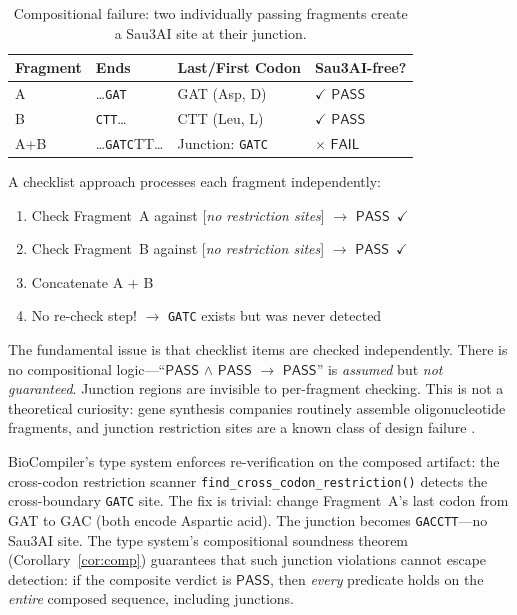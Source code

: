 \documentclass[acmsmall,review,anonymous]{acmart}
\newcommand{\PASS}{\ensuremath{\mathsf{PASS}}\xspace}
\newcommand{\FAIL}{\ensuremath{\mathsf{FAIL}}\xspace}
\begin{document}
\begin{table}[t]
\centering
\caption{Compositional failure: two individually passing fragments
         create a Sau3AI site at their junction.}
\label{tab:junction}
\begin{tabular}{llll}
\toprule
\textbf{Fragment} & \textbf{Ends} & \textbf{Last/First Codon} &
  \textbf{Sau3AI-free?} \\
\midrule
A & \dots\texttt{GAT} & GAT (Asp, D) & $\checkmark$ \PASS \\
B & \texttt{CTT}\dots & CTT (Leu, L) & $\checkmark$ \PASS \\
A+B & \dots\texttt{GATC}TT\dots & Junction: \texttt{GATC} &
  $\times$ \FAIL \\
\bottomrule
\end{tabular}
\end{table}

A checklist approach processes each fragment independently:
\begin{enumerate}[leftmargin=*,itemsep=0pt,topsep=1pt]
\item Check Fragment~A against [\emph{no restriction sites}]
      $\to$ \PASS~$\checkmark$
\item Check Fragment~B against [\emph{no restriction sites}]
      $\to$ \PASS~$\checkmark$
\item Concatenate A $+$ B
\item No re-check step! $\to$ \texttt{GATC} exists but was never
      detected
\end{enumerate}

The fundamental issue is that checklist items are checked
independently.
There is no compositional logic---``\PASS{} $\wedge$ \PASS{}
$\to$ \PASS'' is \emph{assumed} but \emph{not guaranteed}.
Junction regions are invisible to per-fragment checking.
This is not a theoretical curiosity: gene synthesis companies
routinely assemble oligonucleotide fragments, and junction
restriction sites are a known class of design failure
\cite{piret2020dnachisel}.

BioCompiler's type system enforces re-verification on the composed
artifact: the cross-codon restriction scanner
\texttt{find\_cross\_codon\_restriction()} detects the cross-boundary
\texttt{GATC} site.
The fix is trivial: change Fragment~A's last codon from GAT to GAC
(both encode Aspartic acid).
The junction becomes \texttt{GACCTT}---no Sau3AI site.
The type system's compositional soundness theorem
(Corollary~\ref{cor:comp}) guarantees that such junction violations
cannot escape detection: if the composite verdict is \PASS, then
\emph{every} predicate holds on the \emph{entire} composed sequence,
including junctions.
\end{document}
